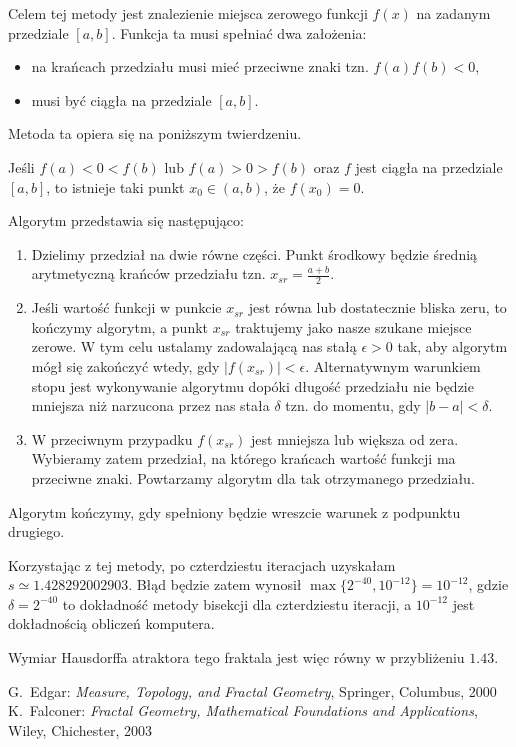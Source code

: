 \documentclass{mini}
\begin{document}
Celem tej metody jest znalezienie miejsca zerowego funkcji $f(x)$ na zadanym przedziale $[a,b]$. Funkcja ta musi spełniać dwa założenia:
\begin{itemize}
\item na krańcach przedziału musi mieć przeciwne znaki tzn. $f(a)f(b)<0$,\\
\item musi być ciągła na przedziale $[a,b]$. 
\end{itemize} 

Metoda ta opiera się na poniższym twierdzeniu.

\begin{tws}
Jeśli $f(a)<0<f(b)$ lub $f(a)>0>f(b)$ oraz $f$ jest ciągła na przedziale $[a,b]$, to istnieje taki punkt $x_0\in (a,b)$, że $f(x_0)=0$. 
\end{tws} 

Algorytm przedstawia się następująco:
\begin{enumerate}
\item Dzielimy przedział na dwie równe części. Punkt środkowy będzie średnią arytmetyczną krańców przedziału tzn. $x_{sr}=\frac{a+b}{2}$.\\
\item Jeśli wartość funkcji w punkcie $x_{sr}$ jest równa lub dostatecznie bliska zeru, to kończymy algorytm, a punkt $x_{sr}$ traktujemy jako nasze szukane miejsce zerowe. W tym celu ustalamy zadowalającą nas stałą $\epsilon>0$ tak, aby algorytm mógł się zakończyć wtedy, gdy $|f(x_{sr})|<\epsilon$. Alternatywnym warunkiem stopu jest wykonywanie algorytmu dopóki długość przedziału nie będzie mniejsza niż narzucona przez nas stała $\delta$ tzn. do momentu, gdy $|b-a|<\delta$. \\
\item W przeciwnym przypadku $f(x_{sr})$ jest mniejsza lub większa od zera. Wybieramy zatem przedział,  na którego krańcach wartość funkcji ma przeciwne znaki. Powtarzamy algorytm dla tak otrzymanego przedziału.  
\end{enumerate}
Algorytm kończymy, gdy spełniony będzie wreszcie warunek z podpunktu drugiego.

Korzystając z tej metody, po czterdziestu iteracjach uzyskałam $s\simeq 1.428292002903$. Błąd będzie zatem  wynosił $\max\lbrace 2^{-40}, 10^{-12} \rbrace=10^{-12}$, gdzie $\delta = 2^{-40}$ to dokładność metody bisekcji dla czterdziestu iteracji, a $10^{-12}$ jest dokładnością obliczeń komputera. 

Wymiar Hausdorffa atraktora tego fraktala jest więc równy w przybliżeniu $1.43$.


\begin{thebibliography}{9}
 G.~Edgar: \emph{Measure, Topology, and Fractal Geometry}, Springer, Columbus, 2000
 K.~Falconer: \emph{Fractal Geometry, Mathematical Foundations and Applications}, Wiley, Chichester, 2003
\end{thebibliography}

\makestatement
\end{document}
